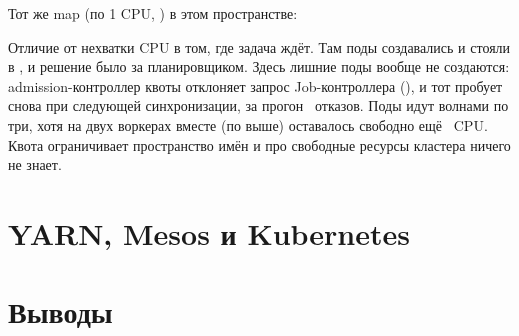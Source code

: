Тот же map (по 1 CPU, ) в этом пространстве:


Отличие от нехватки CPU в том, где задача ждёт. Там поды создавались и стояли в , и решение было за планировщиком. Здесь лишние поды вообще не создаются: admission-контроллер квоты отклоняет запрос Job-контроллера (), и тот пробует снова при следующей синхронизации, за прогон \quotaFailedCreate\ отказов. Поды идут волнами по три, хотя на двух воркерах вместе (по  выше) оставалось свободно ещё \quotaFreeCpu\ CPU. Квота ограничивает пространство имён и про свободные ресурсы кластера ничего не знает.


\section{YARN, Mesos и Kubernetes}\label{sec:yarn}


\section{Выводы}\label{sec:conclusions}

